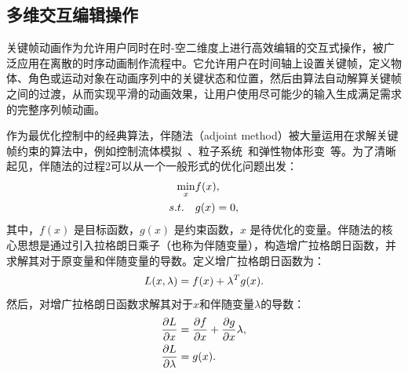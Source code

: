 \subsection{多维交互编辑操作}

关键帧动画作为允许用户同时在时-空二维度上进行高效编辑的交互式操作，被广泛应用在离散的时序动画制作流程中。它允许用户在时间轴上设置关键帧，定义物体、角色或运动对象在动画序列中的关键状态和位置，然后由算法自动解算关键帧之间的过渡，从而实现平滑的动画效果，让用户使用尽可能少的输入生成满足需求的完整序列帧动画。

作为最优化控制中的经典算法，伴随法（adjoint method）被大量运用在求解关键帧约束的算法中，例如控制流体模拟~\cite{mcnamara2004fluid}、粒子系统~\cite{wojtan2006keyframe}和弹性物体形变~\cite{li2013interactive}等。为了清晰起见，伴随法的过程2可以从一个一般形式的优化问题出发：%
\begin{equation}
\setlength\abovedisplayskip{10pt}
\setlength\belowdisplayskip{10pt}
\begin{aligned}
    \min_{x}&f(x), \\
    s.t. \quad &g(x)=0,
\end{aligned}
\label{eq:intro_adjoint1}
\end{equation}
其中，$f(x)$ 是目标函数，$g(x)$ 是约束函数，$x$ 是待优化的变量。伴随法的核心思想是通过引入拉格朗日乘子（也称为伴随变量），构造增广拉格朗日函数，并求解其对于原变量和伴随变量的导数。定义增广拉格朗日函数为：
\begin{equation}
\setlength\abovedisplayskip{10pt}
\setlength\belowdisplayskip{10pt}
    L(x, \lambda) = f(x) + \lambda^T g(x).
\label{eq:intro_adjoint2}
\end{equation}
然后，对增广拉格朗日函数求解其对于$x$和伴随变量$\lambda$的导数：
\begin{equation}
\setlength\abovedisplayskip{10pt}
\setlength\belowdisplayskip{10pt}
\begin{aligned}
    \frac{\partial L}{\partial x} &= \frac{\partial f}{\partial x} + \frac{\partial g}{\partial x} \lambda, \\
    \frac{\partial L}{\partial \lambda} &= g(x).
\end{aligned}
\label{eq:intro_adjoint3}
\end{equation}
